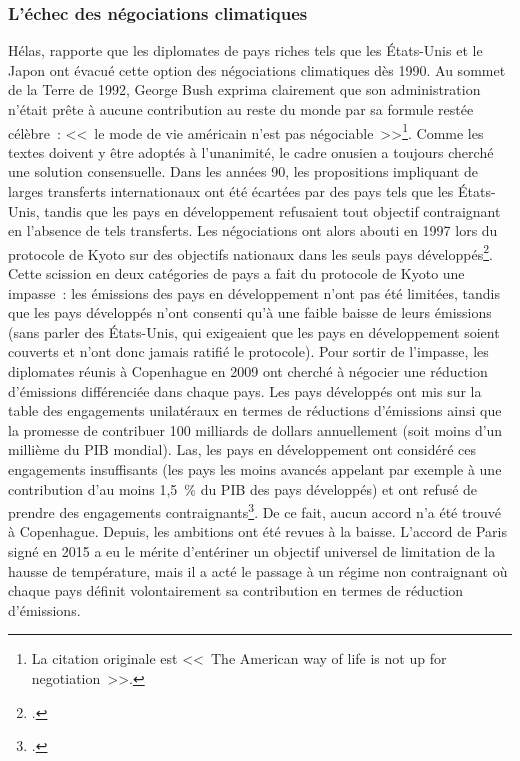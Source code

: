\documentclass[a5paper,french,openany]{memoir}
\begin{document}
\subsubsection{L'échec des négociations climatiques}
Hélas, \citet{bertram_tradeable_1992} rapporte que les diplomates de pays riches tels que les États-Unis et le Japon ont évacué cette option des négociations climatiques dès 1990. Au sommet de la Terre de 1992, George Bush exprima clairement que son administration n'était prête à aucune contribution au reste du monde par sa formule restée célèbre~: <<~le mode de vie américain n'est pas négociable~>>\footnote{La citation originale est <<~The American way of life is not up for negotiation~>>.}. %
Comme les textes doivent y être adoptés à l'unanimité, le cadre onusien a toujours cherché une solution consensuelle. Dans les années 90, les propositions impliquant de larges transferts internationaux ont été écartées par des pays tels que les États-Unis, tandis que les pays en développement refusaient tout objectif contraignant en l'absence de tels transferts. Les négociations ont alors abouti en 1997 lors du protocole de Kyoto sur des objectifs nationaux dans les seuls pays développés\footnote{\cite{gupta_history_2010}.}. Cette scission en deux catégories de pays a fait du protocole de Kyoto une impasse~: les émissions des pays en développement n'ont pas été limitées, tandis que les pays développés n'ont consenti qu'à une faible baisse de leurs émissions (sans parler des États-Unis, qui exigeaient que les pays en développement soient couverts et n'ont donc jamais ratifié le protocole). Pour sortir de l'impasse, les diplomates réunis à Copenhague en 2009 ont cherché à négocier une réduction d'émissions différenciée dans chaque pays. Les pays développés ont mis sur la table des engagements unilatéraux en termes de réductions d'émissions ainsi que la promesse de contribuer 100 milliards de dollars annuellement (soit moins d'un millième du PIB mondial). Las, les pays en développement ont considéré ces engagements insuffisants (les pays les moins avancés appelant par exemple à une contribution d'au moins 1,5~\% du PIB des pays développés) et ont refusé de prendre des engagements contraignants\footnote{\cite{dimitrov_inside_2010}.}. De ce fait, aucun accord n'a été trouvé à Copenhague. Depuis, les ambitions ont été revues à la baisse. L'accord de Paris signé en 2015  a eu le mérite d'entériner un objectif universel de limitation de la hausse de température, mais il a acté le passage à un régime non contraignant où chaque pays définit volontairement sa contribution en termes de réduction d'émissions. 
\end{document}
